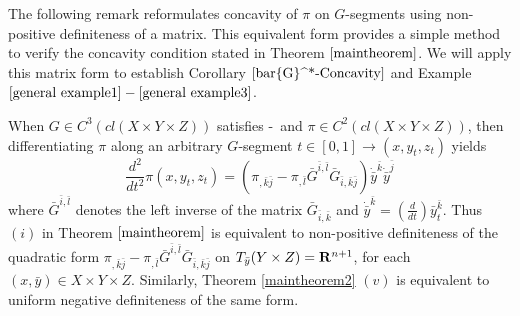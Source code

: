 The following remark reformulates concavity of $\pi$ on $G$-segments using non-positive definiteness of a matrix. This equivalent form provides a simple method to verify the concavity condition stated in Theorem $\ref{maintheorem}$. We will apply this matrix form to establish Corollary $\ref{bar{G}^*-Concavity}$ and Example $\ref{general example1} - \ref{general example3}$.\medskip

\begin{lemma}\label{LemmaProfitConcavity}
	When $G \in C^3(cl(X\times Y \times Z))$ satisfies \Gzero-\Gsix \ and  $\pi \in C^2(cl(X\times Y \times Z))$, then differentiating $\pi$ along an arbitrary $G$-segment $t \in[0,1] \longrightarrow (x,y_t,z_t)$ yields
	\begin{equation}\label{pi second}
	\frac{d^2}{dt^2} \pi(x, y_t, z_t) = (\pi_{,\bar{k}\bar{j}}- \pi_{,\bar{l}} \bar{G}^{\bar i,\bar l}\bar{G}_{\bar{i},\bar{k}\bar{j}}) \dot {\bar y}^{\bar k} \dot {\bar y}^{\bar j}
	\end{equation}
	where $\bar{G}^{\bar i,\bar l}$ denotes the left inverse of the matrix $\bar{G}_{\bar{i}, \bar{k} }$
	and $\dot {\bar y}^{\bar k} = (\frac{d}{dt})\bar y^{\bar k}_t$.
	Thus $(i)$ in Theorem $\ref{maintheorem}$  is equivalent to non-positive  definiteness of the quadratic form 
	$\pi_{,\bar{k}\bar{j}}- \pi_{,\bar{l}} \bar{G}^{\bar i,\bar l}\bar{G}_{\bar{i},\bar{k}\bar{j}}$
	on $T_{\bar y}  (Y\times Z) = {\mathbf R}^{n+1}$, { for each  $(x, \bar y) \in X \times Y \times Z$.} Similarly, Theorem \ref{maintheorem2} $(v)$ is equivalent to uniform negative definiteness of the same form.
\end{lemma}	

